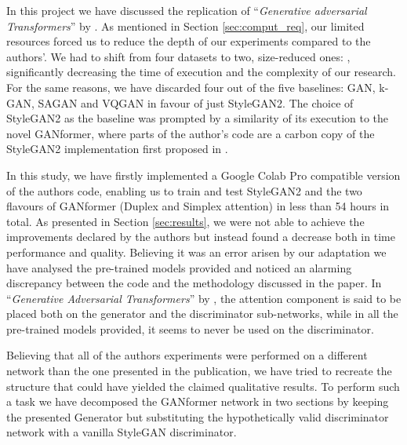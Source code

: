 \documentclass{article}
\begin{document}
In this project we have discussed the replication of ``\emph{Generative adversarial Transformers}'' 
by 
\citet{hudson2021generative}.
As mentioned in Section \ref{sec:comput_req}, our limited resources forced us to reduce the depth 
of our experiments 
compared to the authors'.
We had to shift from four datasets to two, size-reduced ones: \citet{cartoonset}, significantly 
decreasing the time of execution and the complexity of our research.
For the same reasons, we have discarded four out of the five baselines: GAN, k-GAN, SAGAN and 
VQGAN 
in favour of just StyleGAN2.
The choice of StyleGAN2 as the baseline was prompted by a similarity of its execution to the novel 
GANformer, where parts of the author's code are a carbon copy of the StyleGAN2 implementation 
first 
proposed in \citet{karras2019style}.

In this study, we have firstly implemented a Google Colab Pro compatible version of the authors 
code, 
enabling us to train and test StyleGAN2 and the two flavours of GANformer (Duplex and Simplex 
attention) 
in less than 54 hours in total.
As presented in Section \ref{sec:results}, we were not able to achieve the improvements declared by 
the authors but instead 
found a decrease both in time performance and quality.
Believing it was an error arisen by our adaptation we have analysed the pre-trained models provided 
and 
noticed an alarming discrepancy between the code and the methodology discussed in the paper.
In ``\emph{Generative Adversarial Transformers}'' by \citet{hudson2021generative}, the attention 
component 
is said to be placed both on the generator and the discriminator sub-networks, while in all the 
pre-trained 
models provided, it seems to never be used on the discriminator.


Believing that all of the authors experiments were performed on a different network than the one 
presented 
in the publication, we have tried to recreate the structure that could have yielded the claimed 
qualitative results.
To perform such a task we have decomposed the GANformer network in two sections by keeping 
the presented 
Generator but substituting the hypothetically valid discriminator network with a vanilla StyleGAN 
discriminator.
\end{document}
